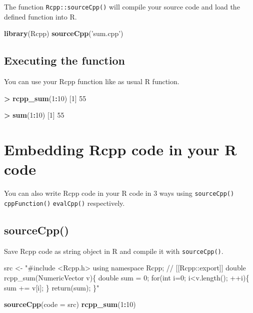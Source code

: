 \documentclass[]{book}
\newenvironment{Shaded}{\begin{snugshade}}{\end{snugshade}}
\newcommand{\DataTypeTok}[1]{\textcolor[rgb]{0.13,0.29,0.53}{#1}}
\newcommand{\DecValTok}[1]{\textcolor[rgb]{0.00,0.00,0.81}{#1}}
\newcommand{\KeywordTok}[1]{\textcolor[rgb]{0.13,0.29,0.53}{\textbf{#1}}}
\newcommand{\NormalTok}[1]{#1}
\newcommand{\OperatorTok}[1]{\textcolor[rgb]{0.81,0.36,0.00}{\textbf{#1}}}
\newcommand{\StringTok}[1]{\textcolor[rgb]{0.31,0.60,0.02}{#1}}
\begin{document}
The function \texttt{Rcpp::sourceCpp()} will compile your source code and load the defined function into R.

\begin{Shaded}
\begin{Highlighting}[]
\KeywordTok{library}\NormalTok{(Rcpp)}
\KeywordTok{sourceCpp}\NormalTok{(}\StringTok{'sum.cpp'}\NormalTok{)}
\end{Highlighting}
\end{Shaded}

\hypertarget{executing-the-function}{%
\section{Executing the function}\label{executing-the-function}}

You can use your Rcpp function like as usual R function.

\begin{Shaded}
\begin{Highlighting}[]
\OperatorTok{>}\StringTok{ }\KeywordTok{rcpp_sum}\NormalTok{(}\DecValTok{1}\OperatorTok{:}\DecValTok{10}\NormalTok{)}
\NormalTok{[}\DecValTok{1}\NormalTok{] }\DecValTok{55}

\OperatorTok{>}\StringTok{ }\KeywordTok{sum}\NormalTok{(}\DecValTok{1}\OperatorTok{:}\DecValTok{10}\NormalTok{)}
\NormalTok{[}\DecValTok{1}\NormalTok{] }\DecValTok{55}
\end{Highlighting}
\end{Shaded}

\hypertarget{embedding-rcpp-code-in-your-r-code}{%
\chapter{Embedding Rcpp code in your R code}\label{embedding-rcpp-code-in-your-r-code}}

You can also write Rcpp code in your R code in 3 ways using \texttt{sourceCpp()} \texttt{cppFunction()} \texttt{evalCpp()} respectively.

\hypertarget{sourcecpp}{%
\section{sourceCpp()}\label{sourcecpp}}

Save Rcpp code as string object in R and compile it with \texttt{sourceCpp()}.

\begin{Shaded}
\begin{Highlighting}[]
\NormalTok{src <-}
\StringTok{"#include <Rcpp.h>}
\StringTok{using namespace Rcpp;}
\StringTok{// [[Rcpp::export]]}
\StringTok{double rcpp_sum(NumericVector v)\{}
\StringTok{  double sum = 0;}
\StringTok{  for(int i=0; i<v.length(); ++i)\{}
\StringTok{    sum += v[i];}
\StringTok{  \}}
\StringTok{  return(sum);}
\StringTok{\}"}

\KeywordTok{sourceCpp}\NormalTok{(}\DataTypeTok{code =}\NormalTok{ src)}
\KeywordTok{rcpp_sum}\NormalTok{(}\DecValTok{1}\OperatorTok{:}\DecValTok{10}\NormalTok{)}
\end{Highlighting}
\end{Shaded}
\end{document}
